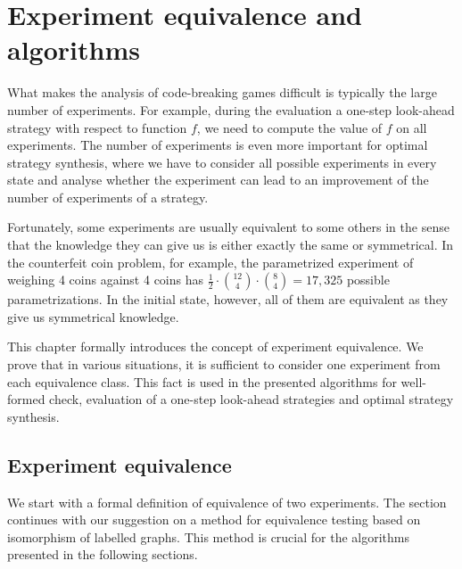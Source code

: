\chapter{Experiment equivalence and algorithms} \label{ch:expeq}

What makes the analysis of code-breaking games difficult is
  typically the large number of experiments.
For example, during the evaluation a one-step look-ahead strategy
  with respect to function $f$,
  we need to compute the value of $f$ on all experiments.
The number of experiments is even more important for optimal strategy synthesis,
  where we have to consider all possible experiments in every state
  and analyse whether the experiment can lead to an improvement
  of the number of experiments of a strategy.

Fortunately, some experiments are usually equivalent to some others in the sense
  that the knowledge they can give us is either exactly the same or symmetrical.
In the counterfeit coin problem, for example,
  the parametrized experiment of weighing 4 coins against 4 coins
  has $\frac{1}{2}\cdot {12 \choose 4}\cdot{8 \choose 4} = 17,325$
  possible parametrizations.
In the initial state, however,
  all of them are equivalent
  as they give us symmetrical knowledge.


This chapter formally introduces the concept of experiment equivalence.
We prove that in various situations, it is sufficient to consider
  one experiment from each equivalence class.
This fact is used in the presented algorithms for well-formed check,
  evaluation of a one-step look-ahead strategies and
  optimal strategy synthesis.

\section{Experiment equivalence} \label{sec:expeq}

We start with a formal definition of equivalence of two experiments.
The section continues with our suggestion on a method for equivalence testing
  based on isomorphism of labelled graphs.
This method is crucial for the algorithms presented in the following sections.

